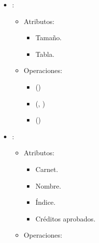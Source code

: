 \documentclass[11pt]{article}
\begin{document}
\begin{itemize}
\begin{itemize}
         \begin{itemize}
            \item {}()
            \item {}()
            \item {}(, )
         \end{itemize}
      \end{itemize}

      \item {}:
      
      \begin{itemize}
         \item Atributos:

         \begin{itemize}
            \item Tamaño.
            \item Tabla.
         \end{itemize}
      \end{itemize}

      \begin{itemize}
         \item Operaciones:
         
         \begin{itemize}
            \item {}()
            \item {}(, )
            \item {}()
         \end{itemize}
      \end{itemize}

      \item {}:
      \begin{itemize}
         \item Atributos:

         \begin{itemize}
            \item Carnet.
            \item Nombre.
            \item Índice.
            \item Créditos aprobados.
         \end{itemize}
      \end{itemize}

      \begin{itemize}
         \item Operaciones:
         

\end{itemize}
\end{itemize}
\end{document}
